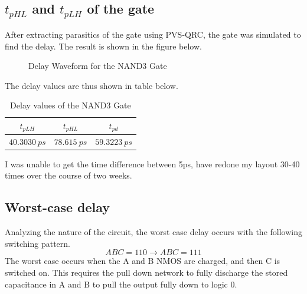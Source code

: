 \documentclass[12pt]{article}
\begin{document}
\subsection{$t_{pHL}$ and $t_{pLH}$ of the gate} %
After extracting parasitics of the gate using PVS-QRC, the gate was simulated to find the delay. The result is shown in the figure below.
\begin{figure} [H]
    \centering
    \caption{Delay Waveform for the NAND3 Gate}
\end{figure}
The delay values are thus shown in table below.
\begin{table} [H]
    \centering
    \begin{tabular}{ccc}
        $t_{pLH}$ & $t_{pHL}$ &  $t_{pd}$\\
        \hline
        $\SI{40.3030}{ps}$&$\SI{78.615}{ps}$ & $\SI{59.3223}{ps}$
    \end{tabular}
    \caption{Delay values of the NAND3 Gate}
\end{table}
I was unable to get the time difference between 5ps, have redone my layout 30-40 times over the course of two weeks. 
\subsection{Worst-case delay}
Analyzing the nature of the circuit, the worst case delay occurs with the following switching pattern.
\[ABC = 110 \rightarrow ABC = 111\]
The worst case occurs when the A and B NMOS are charged, and then C is switched on. This requires the pull down network to fully discharge the stored capacitance in A and B to pull the output fully down to logic 0.
\pagebreak
\end{document}
